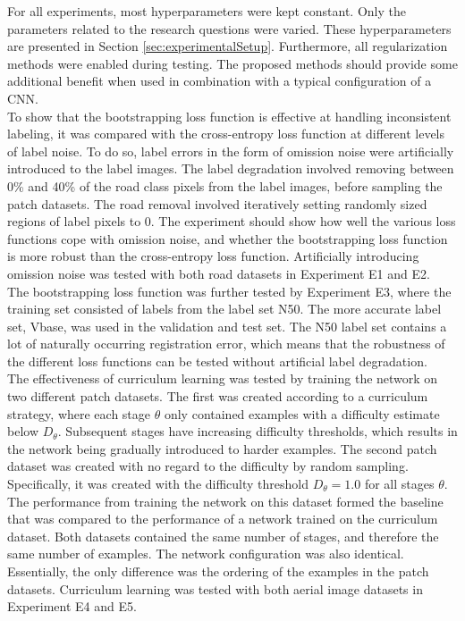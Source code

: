 For all experiments, most hyperparameters were kept constant. Only the parameters related to the research questions were varied. These hyperparameters are presented in Section \ref{sec:experimentalSetup}. Furthermore, all regularization methods were enabled during testing. The proposed methods should provide some additional benefit when used in combination with a typical configuration of a \ac{CNN}.\\

To show that the bootstrapping loss function is effective at handling inconsistent labeling, it was compared with the cross-entropy loss function at different levels of label noise. To do so, label errors in the form of omission noise were artificially introduced to the label images. The label degradation involved removing between 0\% and 40\% of the road class pixels from the label images, before sampling the patch datasets. The road removal involved iteratively setting randomly sized regions of label pixels to 0. The experiment should show how well the various loss functions cope with omission noise, and whether the bootstrapping loss function is more robust than the cross-entropy loss function. Artificially introducing omission noise was tested with both road datasets in Experiment E1 and E2.\\

The bootstrapping loss function was further tested by Experiment E3, where the training set consisted of labels from the label set N50. The more accurate label set, Vbase, was used in the validation and test set. The N50 label set contains a lot of naturally occurring registration error, which means that the robustness of the different loss functions can be tested without artificial label degradation.\\

The effectiveness of curriculum learning was tested by training the network on two different patch datasets. The first was created according to a curriculum strategy, where each stage $\theta$ only contained examples with a difficulty estimate below $D_\theta$. Subsequent stages have increasing difficulty thresholds, which results in the network being gradually introduced to harder examples. The second patch dataset was created with no regard to the difficulty by random sampling. Specifically, it was created with the difficulty threshold $D_\theta =1.0$ for  all stages $\theta$. The performance from training the network on this dataset formed the baseline that was compared to the performance of a network trained on the curriculum dataset. Both datasets contained the same number of stages, and therefore the same number of examples. The network configuration was also identical. Essentially, the only difference was the ordering of the examples in the patch datasets. Curriculum learning was tested with both aerial image datasets in Experiment E4 and E5.\\

